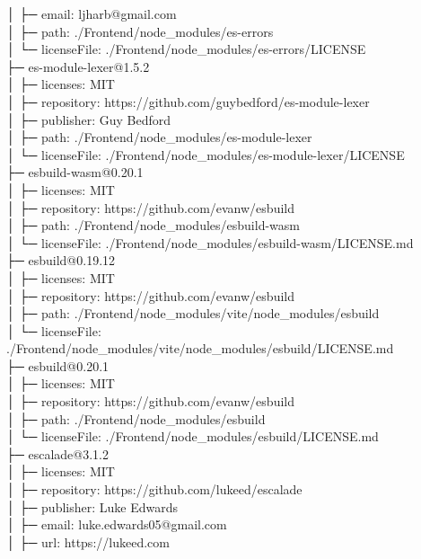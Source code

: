 \documentclass[
    paper=a4,
    twoside=false,
    parskip=half,
    listof=entryprefix,
    listof=totoc,
    index=totoc,
    bibliography=totoc,
    headsepline,
]{scrbook}
\begin{document}
    │  ├─ email: ljharb@gmail.com\\
    │  ├─ path: ./Frontend/node\_modules/es-errors\\
    │  └─ licenseFile: ./Frontend/node\_modules/es-errors/LICENSE\\
    ├─ es-module-lexer@1.5.2\\
    │  ├─ licenses: MIT\\
    │  ├─ repository: https://github.com/guybedford/es-module-lexer\\
    │  ├─ publisher: Guy Bedford\\
    │  ├─ path: ./Frontend/node\_modules/es-module-lexer\\
    │  └─ licenseFile: ./Frontend/node\_modules/es-module-lexer/LICENSE\\
    ├─ esbuild-wasm@0.20.1\\
    │  ├─ licenses: MIT\\
    │  ├─ repository: https://github.com/evanw/esbuild\\
    │  ├─ path: ./Frontend/node\_modules/esbuild-wasm\\
    │  └─ licenseFile: ./Frontend/node\_modules/esbuild-wasm/LICENSE.md\\
    ├─ esbuild@0.19.12\\
    │  ├─ licenses: MIT\\
    │  ├─ repository: https://github.com/evanw/esbuild\\
    │  ├─ path: ./Frontend/node\_modules/vite/node\_modules/esbuild\\
    │  └─ licenseFile: ./Frontend/node\_modules/vite/node\_modules/esbuild/LICENSE.md\\
    ├─ esbuild@0.20.1\\
    │  ├─ licenses: MIT\\
    │  ├─ repository: https://github.com/evanw/esbuild\\
    │  ├─ path: ./Frontend/node\_modules/esbuild\\
    │  └─ licenseFile: ./Frontend/node\_modules/esbuild/LICENSE.md\\
    ├─ escalade@3.1.2\\
    │  ├─ licenses: MIT\\
    │  ├─ repository: https://github.com/lukeed/escalade\\
    │  ├─ publisher: Luke Edwards\\
    │  ├─ email: luke.edwards05@gmail.com\\
    │  ├─ url: https://lukeed.com\\
\end{document}
